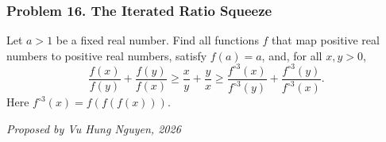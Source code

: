 \subsubsection*{Problem 16. The Iterated Ratio Squeeze}

\begin{exercisebox}[hard]

Let $a>1$ be a fixed real number. Find all functions $f$ that map
positive real numbers to positive real numbers, satisfy $f(a)=a$, and,
for all $x,y>0$,
\[
\frac{f(x)}{f(y)}+\frac{f(y)}{f(x)}
\geq\frac{x}{y}+\frac{y}{x}
\geq\frac{f^{\circ 3}(x)}{f^{\circ 3}(y)}
+\frac{f^{\circ 3}(y)}{f^{\circ 3}(x)}.
\]
Here $f^{\circ 3}(x)=f(f(f(x)))$.

\begin{flushright}
\textit{Proposed by Vu Hung Nguyen, 2026}
\end{flushright}


\end{exercisebox}